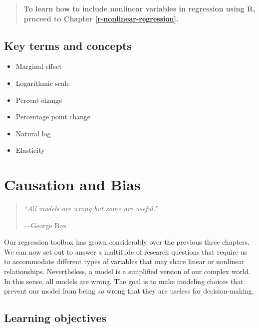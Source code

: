 \documentclass[
]{book}
\providecommand{\tightlist}{%
  \setlength{\itemsep}{0pt}\setlength{\parskip}{0pt}}
\begin{document}
\begin{quote}
\textbf{To learn how to include nonlinear variables in regression using R, proceed to Chapter \ref{r-nonlinear-regression}.}
\end{quote}

\hypertarget{kt8}{%
\section{Key terms and concepts}\label{kt8}}

\begin{itemize}
\tightlist
\item
  Marginal effect
\item
  Logarithmic scale
\item
  Percent change
\item
  Percentage point change
\item
  Natural log
\item
  Elasticity
\end{itemize}

\hypertarget{causation-and-bias}{%
\chapter{Causation and Bias}\label{causation-and-bias}}

\begin{quote}
\emph{``All models are wrong but some are useful.''}

---George Box
\end{quote}

Our regression toolbox has grown considerably over the previous three chapters. We can now set out to answer a multitude of research questions that require us to accommodate different types of variables that may share linear or nonlinear relationships. Nevertheless, a model is a simplified version of our complex world. In this sense, all models are wrong. The goal is to make modeling choices that prevent our model from being \emph{so} wrong that they are useless for decision-making.

\hypertarget{lo9}{%
\section{Learning objectives}\label{lo9}}
\end{document}
